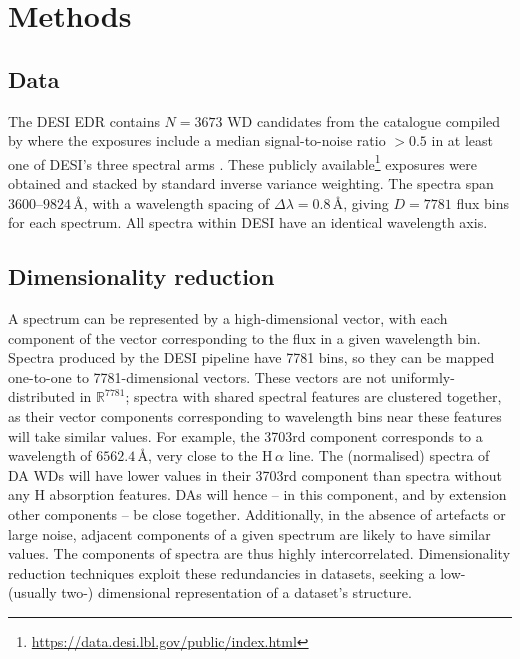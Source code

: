\documentclass[fleqn,usenatbib]{mnras}
\begin{document}
\section{Methods}
\label{sec:methods}

\subsection{Data}

The DESI EDR contains $N=3673$ WD candidates from the catalogue compiled by \citet{gentilefusillo19} where the exposures include a median signal-to-noise ratio $>0.5$ in at least one of DESI's three spectral arms \citep{manser24}.
These publicly available\footnote{
    \url{https://data.desi.lbl.gov/public/index.html}
} exposures were obtained and stacked by standard inverse variance weighting.
The spectra span $3600$--$9824\,\text{\AA}$, with a wavelength spacing of $\Delta \lambda = 0.8\,\text{\AA}$, giving $D=7781$ flux bins for each spectrum.
All spectra within DESI have an identical wavelength axis.

\subsection{Dimensionality reduction}

A spectrum can be represented by a high-dimensional vector, with each component of the vector corresponding to the flux in a given wavelength bin.
Spectra produced by the DESI pipeline have 7781 bins, so they can be mapped one-to-one to 7781-dimensional vectors.
These vectors are not uniformly-distributed in $\mathbb{R}^{7781}$;
spectra with shared spectral features are clustered together, as their vector components corresponding to wavelength bins near these features will take similar values.
For example, the 3703rd component corresponds to a wavelength of $6562.4\,\text{\AA}$, very close to the H$\,\alpha$ line.
The (normalised) spectra of DA WDs will have lower values in their 3703rd component than spectra without any H absorption features.
DAs will hence -- in this component, and by extension other components -- be close together.
Additionally, in the absence of artefacts or large noise, adjacent components of a given spectrum are likely to have similar values.
The components of spectra are thus highly intercorrelated.
Dimensionality reduction techniques exploit these redundancies in datasets, seeking a low- (usually two-) dimensional representation of a dataset's structure.
\end{document}
